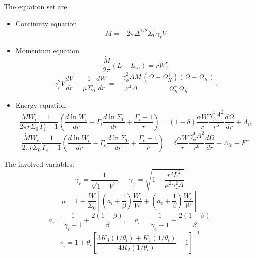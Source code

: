 \documentclass[12pt]{book}
\begin{document}
The equation set are
\begin{itemize}
 \item Continuity equation
%
\begin{equation}
 \dot M=-2\pi \Delta^{1/2} \Sigma_0\gamma_r V
\end{equation}
%

\item Momentum equation
%
\begin{equation}
\frac{\dot M}{2\pi}(L-L_{in})=rW_{\phi}^r
\end{equation}
%
%
\begin{equation}
\gamma_r^2V\frac{dV}{dr}+\frac{1}{\mu\Sigma_{0}}\frac{dW}{dr}=-\frac{\gamma_\phi^2AM}{r^4\Delta}
\frac{(\Omega-\Omega_K^+)(\Omega-\Omega_K^-)}{\Omega_K^+\Omega_K^-}.
\end{equation}
%

\item Energy equation
%
\begin{equation}
\frac{\dot M W_i}{2\pi r\Sigma_{0}}\frac{1}{\Gamma_i-1}\left(\frac{d\ln W_i}{dr}-
\Gamma_i\frac{d\ln \Sigma_0}{dr}+\frac{\Gamma_i-1}{r}\right)=(1-\delta)\frac{\alpha W}{r}
\frac{\gamma_\phi^4A^2}{r^6}\frac{d\Omega}{dr}+\Lambda_{ie}
\end{equation}
%
\begin{equation}
\frac{\dot M W_e}{2\pi r\Sigma_{0}}\frac{1}{\Gamma_e-1}\left(\frac{d\ln W_e}{dr}-
\Gamma_e\frac{d\ln \Sigma_0}{dr}+\frac{\Gamma_e-1}{r}\right)=\delta\frac{\alpha W}{r}
\frac{\gamma_\phi^4A^2}{r^6}\frac{d\Omega}{dr}-\Lambda_{ie}+F^{-}
\end{equation}
%
\end{itemize}
The involved variables:
\begin{equation}
\gamma_r=\frac{1}{\sqrt{1-V^2}},~~~~~\gamma_\phi=\sqrt{1+\frac{r^2L^2}{\mu^2\gamma_r^2A}}
\end{equation}
\begin{equation}
\mu=1+\frac{W}{\Sigma_0}\left[\left(a_i+\frac{1}{\beta}\right)\frac{W_i}{W}+
\left(a_e+\frac{1}{\beta}\right)\frac{W_e}{W}\right]
\end{equation}
\begin{equation}
a_i=\frac{1}{\gamma_i-1}+\frac{2(1-\beta)}{\beta},~~~~~a_e=\frac{1}{\gamma_e-1}+\frac{2(1-\beta)}{\beta} 
\end{equation}
\begin{equation}
 \gamma_i=1+\theta_i\left[\frac{3K_3(1/\theta_i)+K_1(1/\theta_i)}{4K_2(1/\theta_i)}-1\right]^{-1}
\end{equation}
\end{document}
